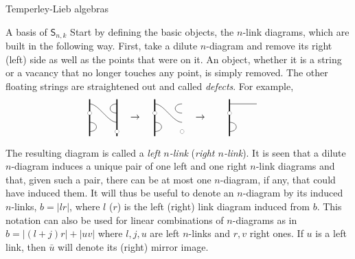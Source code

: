 \documentclass[reqno]{amsart}
\newcommand{\vac}[1]{\draw (#1) circle (1/5);
 	\fill[white] (#1) circle (1/5)}
\newcommand{\defect}[1]{\draw (#1) --++ (3,0)}
\newcommand{\bord}[2]{\draw[very thick] (#1,-1/2) --++ (0,#2)}
\newcommand{\link}[4]{\draw (#1) .. controls (#2) and (#3) .. (#4)}
\newcommand{\ds}[1]{\mathsf S_{#1}}
\begin{document}
\begin{section}{Temperley-Lieb algebras}
\begin{subsection}{A basis of $\ds{n,k}$}
Start by defining the basic objects, the $n$-link diagrams, which are built in the following way. First, take a dilute $n$-diagram and remove its right (left) side as well as the points that were on it. An object, whether it is a string or a vacancy that no longer touches any point, is simply removed. The other floating strings are straightened out and called \emph{defects}. For example,
\begin{alignat*}{3}
\begin{tikzpicture}[scale = 1/3]
	\bord{0}{4};
	\bord{3}{4};	
	\link{0,3}{1,3}{2,1}{3,1};
	\link{0,0}{1,0}{1,1}{0,1};
	\link{3,2}{2,2}{2,3}{3,3};
	\vac{0,2};
	\vac{3,0};
	\node at (5,1.5) {$\rightarrow$     };
\end{tikzpicture}&\quad
\begin{tikzpicture}[scale=1/3]
	\bord{0}{4};
	\link{0,3}{1,3}{2,1}{3,1};
	\link{0,0}{1,0}{1,1}{0,1};
	\link{3,2}{2,2}{2,3}{3,3};
	\vac{0,2};
	\vac{3,0};
	\node at (5,1.5) {$\rightarrow$     };
\end{tikzpicture}& \quad
\begin{tikzpicture}[scale=1/3]
	\bord{0}{4};
	\defect{0,3};
	\link{0,0}{1,0}{1,1}{0,1};
	\vac{0,2};
	\node at (4,1.5) {\ };
\end{tikzpicture}
\end{alignat*}
The resulting diagram is called a {\em left $n$-link} ({\em right $n$-link}). It is seen that a dilute $n$-diagram induces a unique pair of one left and one right $n$-link diagrams and that, given such a pair, there can be at most one $n$-diagram, if any, that could have induced them. It will thus be useful to denote an $n$-diagram by its induced $n$-links, $b= |l r|$, where $l$ ($r$) is the left (right) link diagram induced from $b$.  This notation can also be used for linear combinations of $n$-diagrams as in $b=|(l+j)r| + |uv|$ where $l, j, u$ are left $n$-links and $r, v$ right ones. If $u$ is a left link, then $\bar u$ will denote its (right) mirror image. 



\end{subsection}
\end{section}
\end{document}
